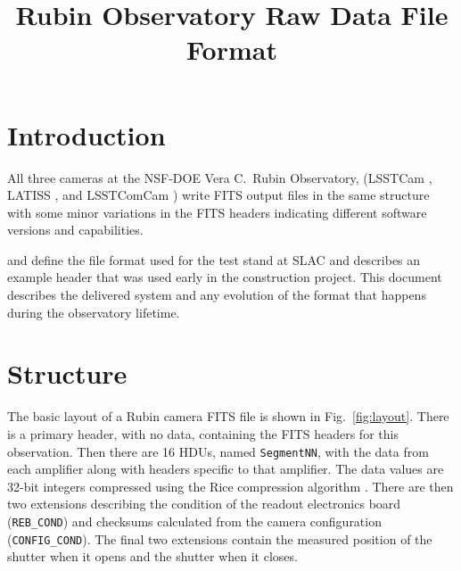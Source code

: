 \documentclass[OPS,lsstdraft,authoryear,toc]{lsstdoc}
\title{Rubin Observatory Raw Data File Format}
\date{\vcsDate}
\begin{document}
\maketitle


\section{Introduction}

All three cameras at the NSF-DOE Vera C.\ Rubin Observatory, (LSSTCam \citep{10.71929/rubin/2571927}, LATISS \citep{10.71929/rubin/2571930}, and LSSTComCam \citep{10.71929/rubin/2561361}) write FITS output files in the same structure with some minor variations in the FITS headers indicating different software versions and capabilities.

 and  define the file format used for the test stand at SLAC and  describes an example header that was used early in the construction project.
This document describes the delivered system and any evolution of the format that happens during the observatory lifetime.

\section{Structure}

The basic layout of a Rubin camera FITS file is shown in Fig.~\ref{fig:layout}.
There is a primary header, with no data, containing the FITS headers for this observation.
Then there are 16 HDUs, named \texttt{SegmentNN}, with the data from each amplifier along with headers specific to that amplifier.
The data values are 32-bit integers compressed using the Rice compression algorithm \citep{2012arXiv1201.1336W}.
There are then two extensions describing the condition of the readout electronics board (\texttt{REB\_COND}) and checksums calculated from the camera configuration (\texttt{CONFIG\_COND}).
The final two extensions contain the measured position of the shutter when it opens and the shutter when it closes.
\end{document}
